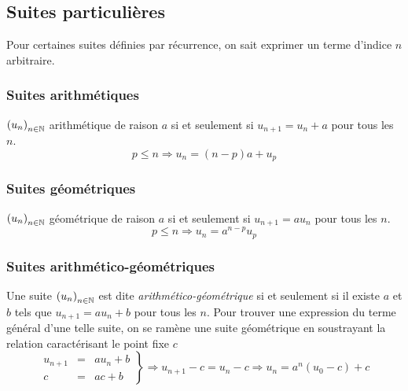 \subsection{Suites particulières}
Pour certaines suites définies par récurrence, on sait exprimer un terme d'indice $n$ arbitraire.
\subsubsection{Suites arithmétiques}
$\left( u_n\right)_{n\in \mathbb{N}}$ arithmétique de raison $a$ si et seulement si $u_{n+1} = u_n +a$ pour tous les $n$. 
\begin{displaymath}
  p \leq n \Rightarrow u_n = (n-p)a + u_p
\end{displaymath}
\subsubsection{Suites géométriques}
$\left( u_n\right)_{n\in \mathbb{N}}$ géométrique de raison $a$ si et seulement si $u_{n+1} = au_n$ pour tous les $n$. 
\begin{displaymath}
  p \leq n \Rightarrow u_n = a^{n-p}u_p
\end{displaymath}

\subsubsection{Suites arithmético-géométriques}
Une suite $\left( u_n\right)_{n\in \mathbb{N}}$ est dite \emph{arithmético-géométrique} si et seulement si il existe $a$ et $b$ tels que $u_{n+1} = au_n +b$ pour tous les $n$.\newline
Pour trouver une expression du terme général d'une telle suite, on se ramène une suite géométrique en soustrayant la relation caractérisant le point fixe $c$
\begin{displaymath}
\left. 
\begin{aligned}
u_{n+1} &=& au_n + b\\ c &=& ac +b  
\end{aligned}
\right\rbrace 
\Rightarrow u_{n+1}-c = u_n -c \Rightarrow u_n = a^{n}(u_0-c) +c
\end{displaymath}

